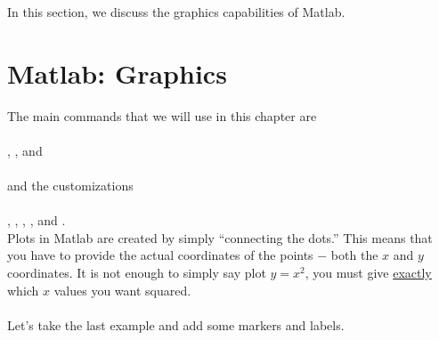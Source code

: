 
In this section, we discuss the graphics capabilities of Matlab.

\section{Matlab: Graphics}\label{sec:Matlab_graphics}

The main commands that we will use in this chapter are\\
\\
, , and  \\
\\
and the customizations\\
\\ 
, , , , and .\\

Plots in Matlab are created by simply ``connecting the dots.''  This means that you have to provide the actual coordinates of the points $-$ both the $x$ and $y$ coordinates.  It is not enough to simply say plot $y=x^2$, you must give \underline{exactly} which $x$ values you want squared. \\

\\

Let's take the last example and add some markers and labels.\\

